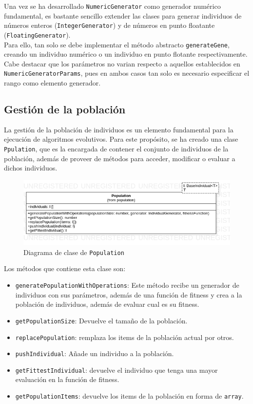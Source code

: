 Una vez se ha desarrollado \texttt{NumericGenerator} como generador numérico fundamental, es bastante sencillo extender las clases para generar individuos de números enteros (\texttt{IntegerGenerator}) y de números en punto floatante (\texttt{FloatingGenerator}). \\

Para ello, tan solo se debe implementar el método abstracto \texttt{generateGene}, creando un individuo numérico o un individuo en punto flotante respectivamente. Cabe destacar que los parámetros no varian respecto a aquellos establecidos en \texttt{NumericGeneratorParams}, pues en ambos casos tan solo es necesario especificar el rango como elemento generador.

\subsection{Gestión de la población}

La gestión de la población de individuos es un elemento fundamental para la ejecución de algoritmos evolutivos. Para este propósito, se ha creado una clase \texttt{Ppulation}, que es la encargada de contener el conjunto de individuos de la población, además de proveer de métodos para acceder, modificar o evaluar a dichos individuos. \\

\begin{figure}[ht]
    \centering
    \includegraphics[scale=0.6]{mem/images/cap-4/4.2.4(Population)/Population.png}
    \caption{Diagrama de clase de \texttt{Population}}
    \label{fig:generator-uml}
\end{figure}


Los métodos que contiene esta clase son:

\begin{itemize}
    \item \texttt{generatePopulationWithOperations}: Este método recibe un generador de individuos con sus parámetros, además de una función de fitness y crea a la población de individuos, además de evaluar cual es su fitness.
    \item \texttt{getPopulationSize}: Devuelve el tamaño de la población.
    \item \texttt{replacePopulation}: remplaza los items de la población actual por otros.
    \item \texttt{pushIndividual}: Añade un individuo a la población.
    \item \texttt{getFittestIndividual}: devuelve el individuo que tenga una mayor evaluación en la función de fitness.
    \item \texttt{getPopulationItems}: devuelve los items de la población en forma de \texttt{array}.
\end{itemize}


